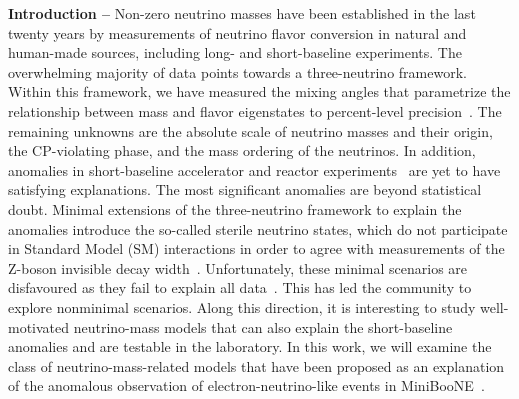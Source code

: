 \graphicspath{{}{miniboone/figs/}{miniboone/}}

\textbf{Introduction --} Non-zero neutrino masses have been established in the last twenty years by measurements of neutrino flavor conversion in natural and human-made sources, including long- and short-baseline experiments. The overwhelming majority of data points towards a three-neutrino framework. Within this framework, we have measured the mixing angles that parametrize the relationship between mass and flavor eigenstates to percent-level precision~\cite{Esteban:2018azc}. The remaining unknowns are the absolute scale of neutrino masses and their origin, the CP-violating phase, and the mass ordering of the neutrinos. In addition, anomalies in short-baseline accelerator and reactor experiments~\cite{Athanassopoulos:1996jb,Aguilar:2001ty,AguilarArevalo:2007it,Aguilar-Arevalo:2018gpe} are yet to have satisfying explanations. The most significant anomalies are beyond statistical doubt. Minimal extensions of the three-neutrino framework to explain the anomalies introduce the so-called sterile neutrino states, which do not participate in Standard Model (SM) interactions in order to agree with measurements of the Z-boson invisible decay width~\cite{ALEPH:2010aa}. Unfortunately, these minimal scenarios are disfavoured as they fail to explain all data~\cite{Collin:2016aqd, Capozzi:2016vac, Dentler:2018sju}. This has led the community to explore nonminimal scenarios. Along this direction, it is interesting to study well-motivated neutrino-mass models that can also explain the short-baseline anomalies and are testable in the laboratory. In this work, we will examine the class of neutrino-mass-related models that have been proposed as an explanation of the anomalous observation of electron-neutrino-like events in MiniBooNE~\cite{Aguilar-Arevalo:2018gpe}.

